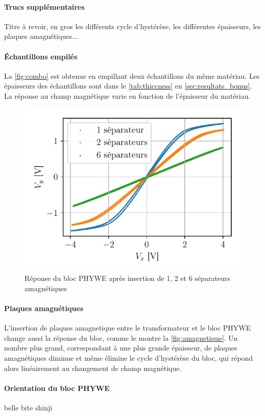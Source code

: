 \paragraph{Trucs supplémentaires}
Titre à revoir, en gros les différents cycle d'hystérèse, les différentes épaisseurs, les plaques amagnétiques...


\begin{minipage}{\linewidth}
    \paragraph{Échantillons empilés}
    La \autoref{fig:combo} est obtenue en empillant deux échantillons du même matériau. Les épaisseurs des échantillons sont dans le \autoref{tab:thiccness} en \autoref{sec:resultats_bonus}. La réponse au champ magnétique varie en fonction de l'épaisseur du matériau.

    \begin{figure}
        \centering
        \includegraphics[width=\linewidth]{figures/separateurs_amagnetique.pdf}
        \caption{Réponse du bloc PHYWE après insertion de 1, 2 et 6 séparateurs amagnétiques}
        \label{fig:amagnetique}
    \end{figure}

    \paragraph{Plaques amagnétiques}
    L'insertion de plaques amagnetique entre le transformateur et le bloc PHYWE change aussi la réponse du bloc, comme le montre la \autoref{fig:amagnetique}. Un nombre plus grand, correspondant à une plus grande épaisseur, de plaques amagnétiques diminue et même élimine le cycle d'hystérèse du bloc, qui répond alors linéairement au changement de champ magnétique.

    \paragraph{Orientation du bloc PHYWE}
    belle bite shinji
\end{minipage}
    
